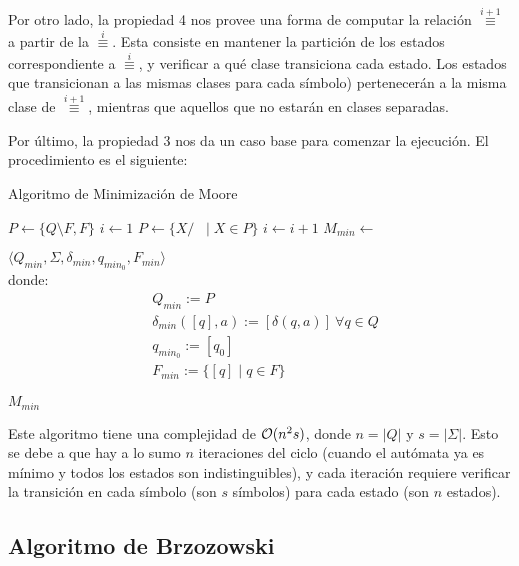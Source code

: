 Por otro lado, la propiedad 4 nos provee una forma de computar la relación $\overset{i + 1}{\equiv}$ a partir de la $\overset{i}{\equiv}$. Esta consiste en mantener la partición de los estados correspondiente a $\overset{i}{\equiv}$, y verificar a qué clase transiciona cada estado. Los estados que transicionan a las mismas clases para cada símbolo) pertenecerán a la misma clase de $\overset{i + 1}{\equiv}$, mientras que aquellos que no estarán en clases separadas.

Por último, la propiedad 3 nos da un caso base para comenzar la ejecución. El procedimiento es el siguiente:

\begin{algorithm}[H]
    \caption{Algoritmo de Minimización de Moore}
    \label{minimizacion-moore}
    \begin{algorithmic}[1]
        \State $P \gets \{Q \setminus F, F\}$
        \State $i \gets 1$
        \State $P \gets \{X / \mathop{\overset{i}{\equiv}} \mid X \in P\}$
        \State $i \gets i + 1$
        \EndWhile
        \State $M_{min} \gets $ \parbox[t]{.5\linewidth}{$\langle Q_{min}, \Sigma, \delta_{min}, q_{min_0}, F_{min} \rangle$ \vspace{3pt}\\
            \small donde:
            $$
            \begin{aligned}
                & Q_{min} := P \\
                & \delta_{min}([q], a) := [\delta(q, a)]\ \forall q \in Q \\
                & q_{min_0} := [q_0] \\
                & F_{min} := \{[q] \mid q \in F\}
            \end{aligned}
            $$}
        \State \Return $M_{min}$
        \EndProcedure
    \end{algorithmic}
\end{algorithm}

Este algoritmo tiene una complejidad de $\mathcal{O}(n^2 s)$, donde $n = |Q|$ y $s = |\Sigma|$. Esto se debe a que hay a lo sumo $n$ iteraciones del ciclo (cuando el autómata ya es mínimo y todos los estados son indistinguibles), y cada iteración requiere verificar la transición en cada símbolo (son $s$ símbolos) para cada estado (son $n$ estados).

\subsection{Algoritmo de Brzozowski}

